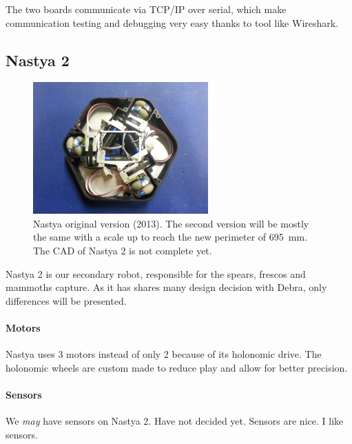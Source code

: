 \documentclass[a4paper]{paper}
\begin{document}
The two boards communicate via TCP/IP over serial, which make communication testing and debugging very easy thanks to tool like Wireshark.

\subsection{Nastya 2}
\begin{figure}[h]
    \begin{center}
        \includegraphics[width=0.6\textwidth]{images/Nastya_I}
        \caption{
            Nastya original version (2013).
            The second version will be mostly the same with a scale up to reach the new perimeter of \SI{695}{\milli\meter}.
            The CAD of Nastya 2 is not complete yet.
        }
        \label{fig:balise}
    \end{center}
\end{figure}
Nastya 2 is our secondary robot, responsible for the spears, frescos and mammoths capture.
As it has shares many design decision with Debra, only differences will be presented.

\paragraph{Motors}
Nastya uses 3 motors instead of only 2 because of its holonomic drive.
The holonomic wheels are custom made to reduce play and allow for better precision.


\paragraph{Sensors}
We \emph{may} have sensors on Nastya 2.
Have not decided yet.
Sensors are nice.
I like sensors.
\end{document}
